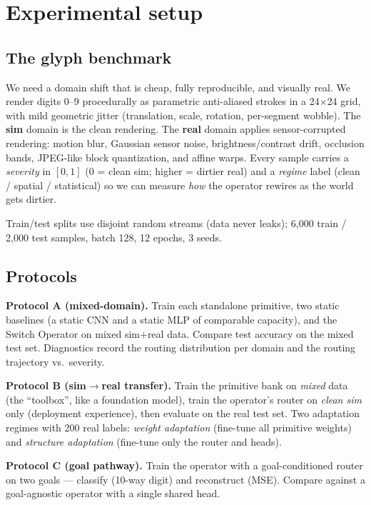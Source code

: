 \documentclass[11pt,a4paper]{article}
\begin{document}
\section{Experimental setup}
\label{sec:setup}

\subsection{The glyph benchmark}
\label{sec:bench}

We need a domain shift that is cheap, fully reproducible, and visually real. We render digits 0--9 procedurally as parametric anti-aliased strokes in a 24$\times$24 grid, with mild geometric jitter (translation, scale, rotation, per-segment wobble). The \textbf{sim} domain is the clean rendering. The \textbf{real} domain applies sensor-corrupted rendering: motion blur, Gaussian sensor noise, brightness/contrast drift, occlusion bands, JPEG-like block quantization, and affine warps. Every sample carries a \emph{severity} in $[0,1]$ (0 = clean sim; higher = dirtier real) and a \emph{regime} label (clean / spatial / statistical) so we can measure \emph{how} the operator rewires as the world gets dirtier.

Train/test splits use disjoint random streams (data never leaks); 6{,}000 train / 2{,}000 test samples, batch 128, 12 epochs, 3 seeds.

\subsection{Protocols}
\label{sec:protocols}

\textbf{Protocol A (mixed-domain).} Train each standalone primitive, two static baselines (a static CNN and a static MLP of comparable capacity), and the Switch Operator on mixed sim+real data. Compare test accuracy on the mixed test set. Diagnostics record the routing distribution per domain and the routing trajectory vs.\ severity.

\textbf{Protocol B (sim$\to$real transfer).} Train the primitive bank on \emph{mixed} data (the ``toolbox'', like a foundation model), train the operator's router on \emph{clean sim} only (deployment experience), then evaluate on the real test set. Two adaptation regimes with 200 real labels: \emph{weight adaptation} (fine-tune all primitive weights) and \emph{structure adaptation} (fine-tune only the router and heads).

\textbf{Protocol C (goal pathway).} Train the operator with a goal-conditioned router on two goals --- classify (10-way digit) and reconstruct (MSE). Compare against a goal-agnostic operator with a single shared head.
\end{document}
